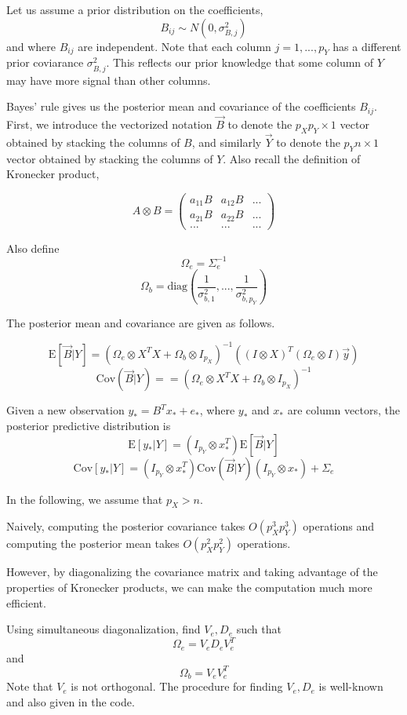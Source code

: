 \documentclass[12pt]{article}
\begin{document}
Let us assume a prior distribution on the coefficients,
$$
B_{ij} \sim N(0, \sigma^2_{B, j})
$$
and where $B_{ij}$ are independent.
Note that each column $j = 1,...,p_Y$ has a different prior coviarance $\sigma^2_{B, j}$.
This reflects our prior knowledge that some column of $Y$ may have more signal than other columns.

Bayes' rule gives us the posterior mean and covariance of the coefficients $B_{ij}$.
First, we introduce the vectorized notation $\vec{B}$ to denote the $p_X p_Y \times 1$ vector obtained by 
stacking the columns of $B$, and similarly $\vec{Y}$ to denote the $p_Y n \times 1$ vector obtained by stacking the columns of $Y$.  Also recall the definition of Kronecker product,

$$
A \otimes B = \begin{pmatrix}a_{11} B & a_{12} B & ...\\
a_{21} B & a_{22} B & ...\\
... & ... & ...\end{pmatrix}
$$

Also define
$$
\Omega_e = \Sigma_e^{-1}
$$
$$
\Omega_b = \text{diag}\left(\frac{1}{\sigma^2_{b, 1}},..., \frac{1}{\sigma^2_{b, p_Y}}\right)
$$

The posterior mean and covariance are given as follows.

$$
\text{E}[\vec{B}|Y] = (\Omega_e \otimes X^T X + \Omega_b \otimes I_{p_X})^{-1} ((I\otimes X)^T (\Omega_e \otimes I) \vec{y})
$$
$$
\text{Cov}(\vec{B}|Y) = = (\Omega_e \otimes X^T X + \Omega_b \otimes I_{p_X})^{-1}
$$

Given a new observation $y_* = B^T x_* + e_*$, where $y_*$ and $x_*$ are column vectors,
the posterior predictive distribution is
$$
\text{E}[y_* | Y] = (I_{p_Y} \otimes x_*^T) \text{E}[\vec{B}|Y]
$$
$$
\text{Cov}[y_* | Y] = (I_{p_Y} \otimes x_*^T) \text{Cov}(\vec{B}|Y) (I_{p_Y} \otimes x_*) + \Sigma_e
$$


In the following, we assume that $p_X > n$.

Naively, computing the posterior covariance takes $O(p_X^3 p_Y^3)$ operations
and computing the posterior mean takes $O(p_X^2 p_Y^2)$ operations.

However, by diagonalizing the covariance matrix and taking advantage of the properties of Kronecker products, we can make the computation much more efficient.

Using simultaneous diagonalization, find $V_e, D_e$ such that
$$
\Omega_e = V_e D_e V_e^T
$$
and
$$
\Omega_b = V_e V_e^T
$$
Note that $V_e$ is not orthogonal.
The procedure for finding $V_e, D_e$ is well-known and also given in the code.
\end{document}
